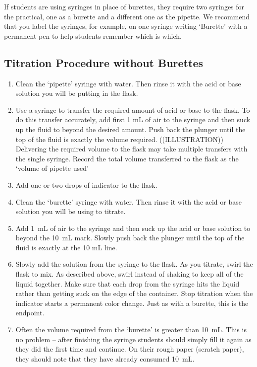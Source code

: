 If students are using syringes in place of burettes, they require two syringes for the practical, one as a burette and a different one as the pipette. We recommend that you label the syringes, for example, on one syringe writing ‘Burette’ with a permanent pen to help students remember which is which.

\subsection{Titration Procedure without Burettes}

\begin{enumerate}

\item{Clean the ‘pipette’ syringe with water. Then rinse it with the acid or base solution you will be putting in the flask.}

\item{Use a syringe to transfer the required amount of acid or base to the flask. To do this transfer accurately, add first 1 mL of air to the syringe and then suck up the fluid to beyond the desired amount. Push back the plunger until the top of the fluid is exactly the volume required. ((ILLUSTRATION)) Delivering the required volume to the flask may take multiple transfers with the single syringe. Record the total volume transferred to the flask as the ‘volume of pipette used’}

\item{Add one or two drops of indicator to the flask.}

\item{Clean the ‘burette’ syringe with water. Then rinse it with the acid or base solution you will be using to titrate.}

\item{Add 1~mL of air to the syringe and then suck up the acid or base solution to beyond the 10~mL mark. Slowly push back the plunger until the top of the fluid is exactly at the 10 mL line.}

\item{Slowly add the solution from the syringe to the flask. As you titrate, swirl the flask to mix. As described above, swirl instead of shaking to keep all of the liquid together. Make sure that each drop from the syringe hits the liquid rather than getting suck on the edge of the container. Stop titration when the indicator starts a permanent color change. Just as with a burette, this is the endpoint.}

\item{Often the volume required from the ‘burette’ is greater than 10~mL. This is no problem – after finishing the syringe students should simply fill it again as they did the first time and continue. On their rough paper (scratch paper), they should note that they have already consumed 10~mL.}

\end{enumerate}

